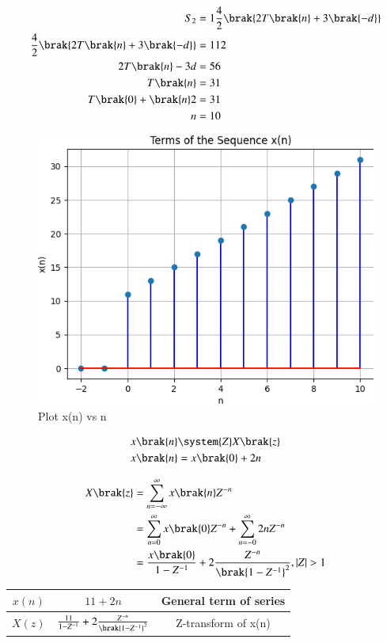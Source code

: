 \documentclass[journal,12pt,twocolumn]{IEEEtran}
\theoremstyle{remark}
\begin{document}
\begin{align}
S_2&=1\frac{4}{2}\brak{2T\brak{n}+3\brak{-d}}\\
\frac{4}{2}\brak{2T\brak{n}+3\brak{-d}}&=112\\
2T\brak{n}-3d&=56\\
T\brak{n}&=31\\
T\brak{0}+\brak{n}2&=31\\
n&=10
\end{align}
\newpage
\begin{figure}
    \includegraphics[width=\columnwidth]{fig.png}
    \centering
    Plot x(n) vs n
    \label{fig:enter-label}
\end{figure}

\begin{align}
	x \brak{n} &\system{Z} X \brak{z}\\
	x\brak{n}&=x\brak{0}+2n
\end{align}

\begin{align}
X\brak{z}&= \sum_{n=-\infty}^{\infty} x\brak{n}Z^{-n} \\
&=\sum_{n=0}^{\infty} x\brak{0}Z^{-n} + \sum_{n=-0}^{\infty}2nZ^{-n}\\
&=\frac{x\brak{0}}{1-Z^{-1}}+2\frac{Z^{-n}}{\brak{1-Z^{-1}}^{2}}, |Z|>1
\end{align}

\footnotesize
\begin{tabular}{|c|c|c|}
\hline
$x(n)$ &$ 11+2n $& General term of series\\
\hline
$X(z)$ & $\frac{11}{1-Z^{-1}}+2\frac{Z^{-n}}{\brak{1-Z^{-1}}^{2}}$ & Z-transform of x(n)\\
\hline
\end{tabular}
\end{document}
